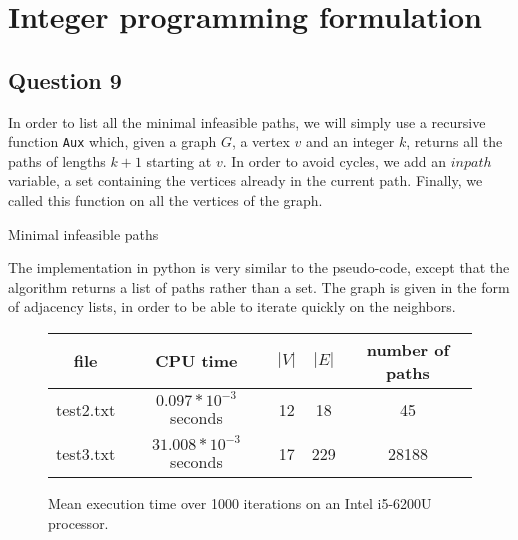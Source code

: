 \documentclass[english]{article}
\begin{document}
\section{Integer programming formulation}

\subsection*{Question 9}

In order to list all the minimal infeasible paths, we will simply use a recursive function \texttt{Aux} which, given a graph $G$, a vertex $v$ and an integer $k$, returns all the paths of lengths $k+1$ starting at $v$. In order to avoid cycles, we add an $inpath$ variable, a set containing the vertices already in the current path. Finally, we called this function on all the vertices of the graph.

\begin{algorithm}

    \caption{Minimal infeasible paths}
    


    
\end{algorithm}

The implementation in python is very similar to the pseudo-code, except that the algorithm returns a list of paths rather than a set. The graph is given in the form of adjacency lists, in order to be able to iterate quickly on the neighbors.

\begin{figure}[ht]
    \centering
    \begin{tabular}{|c|c|c|c|c|}
        \hline
        file & CPU time & $|V|$ & $|E|$ & number of paths \\
        \hline
        test2.txt & $0.097 * 10^{-3}$ seconds & 12 & 18 & 45 \\
        test3.txt & $31.008 * 10^{-3}$ seconds & 17 & 229 & 28188 \\
        \hline
    \end{tabular}
    \caption{Mean execution time over 1000 iterations on an Intel i5-6200U processor.}
\end{figure}
\end{document}
